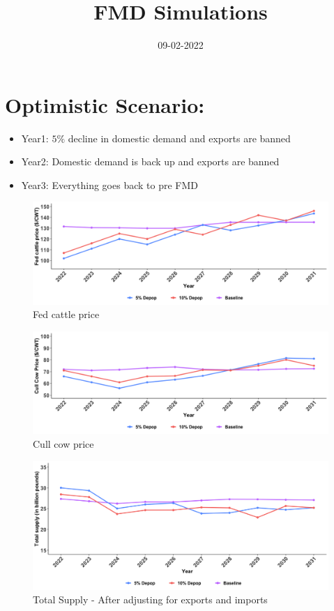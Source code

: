 \documentclass[
]{article}
\title{FMD Simulations}
\author{}
\date{\vspace{-2.5em}09-02-2022}
\begin{document}
\maketitle

\hypertarget{optimistic-scenario}{%
\section{\texorpdfstring{Optimistic
Scenario:\newline}{Optimistic Scenario:}}\label{optimistic-scenario}}

\begin{itemize}
\item Year1: $5\%$ decline in domestic demand and exports are banned
\item Year2: Domestic demand is back up and exports are banned
\item Year3: Everything goes back to pre FMD 
\end{itemize}

\begin{figure}
  \includegraphics[width=1.1\linewidth]{FMD-SimulationPlots/09-02/PsOPT.png}
  \caption{Fed cattle price}
\end{figure}

\begin{figure}
  \includegraphics[width=1.1\linewidth]{FMD-SimulationPlots/09-02/PcOPT.png}
  \caption{Cull cow price}
\end{figure}

\begin{figure}
  \includegraphics[width=1.1\linewidth]{FMD-SimulationPlots/09-02/TotSupplyOPTDOM.png}
  \caption{Total Supply - After adjusting for exports and imports}
\end{figure}
\end{document}
